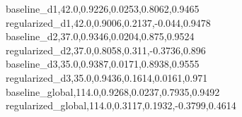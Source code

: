 baseline_{d1},42.0,0.9226,0.0253,0.8062,0.9465
regularized_{d1},42.0,0.9006,0.2137,-0.044,0.9478
baseline_{d2},37.0,0.9346,0.0204,0.875,0.9524
regularized_{d2},37.0,0.8058,0.311,-0.3736,0.896
baseline_{d3},35.0,0.9387,0.0171,0.8938,0.9555
regularized_{d3},35.0,0.9436,0.1614,0.0161,0.971
baseline_{global},114.0,0.9268,0.0237,0.7935,0.9492
regularized_{global},114.0,0.3117,0.1932,-0.3799,0.4614
